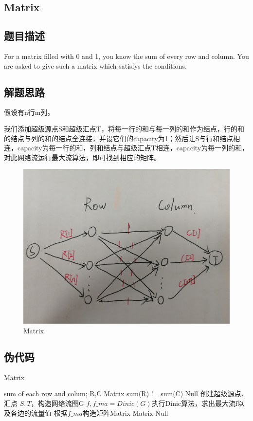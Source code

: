 \documentclass[UTF8,a4paper,12pt]{article}
\begin{document}
\begin{CJK}{UTF8}{gkai}
	\newpage
	\section{Matrix}
	\subsection{题目描述}
	For a matrix filled with 0 and 1, you know the sum of every row and column. You are asked to give such a matrix which satisfys the conditions.
	
	\subsection{解题思路}
	假设有n行m列。
	
	我们添加超级源点S和超级汇点T，将每一行的和与每一列的和作为结点，行的和的结点与列的和的结点全连接，并设它们的capacity为1；然后让S与行和结点相连，capacity为每一行的和，列和结点与超级汇点T相连，capacity为每一列的和，对此网络流运行最大流算法，即可找到相应的矩阵。
	
		\begin{figure}[htb]
		\centering
		\includegraphics[scale=.1]{./2.jpg}
		\caption{Matrix}
	\end{figure}
	
	\subsection{伪代码}
	\begin{algorithm}
		\caption{Matrix}
		\begin{algorithmic}[1]
			\Require sum of each row and colum; R,C
			\Ensure Matrix
				\If sum(R) != sum(C)
					\State \Return Null
				\EndIf
				\State 创建超级源点、汇点 $S,T$，构造网络流图G
				\State $f,f\_ma=Dinic(G)$执行Dinic算法，求出最大流f以及各边的流量值
					\State 根据$ f\_ma $构造矩阵Matrix
					\State \Return Matrix
				\EndIf
				\State \Return Null
			\EndFunction
		\end{algorithmic}
	\end{algorithm}

\end{CJK}
\end{document}
